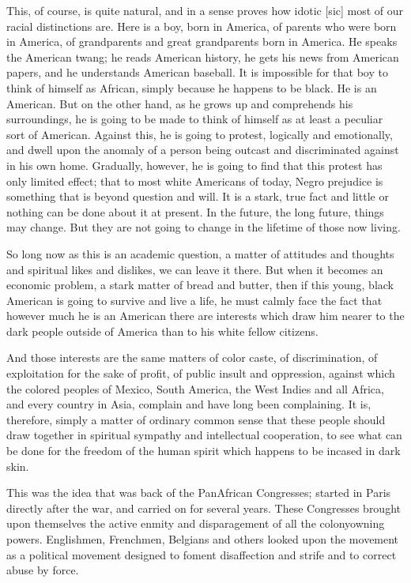 \documentclass[letterpaper,10pt,english]{jupyterBook}
\begin{document}
\sphinxAtStartPar
This, of course, is quite natural, and in a sense proves how idotic {[}sic{]} most of our racial distinctions are. Here is a boy, born in America, of parents who were born in America, of grandparents and great grandparents born in America. He speaks the American twang; he reads American history, he gets his news from American papers, and he understands American baseball. It is impossible for that boy to think of himself as African, simply because he happens to be black. He is an American. But on the other hand, as he grows up and comprehends his surroundings, he is going to be made to think of himself as at least a peculiar sort of American. Against this, he is going to protest, logically and emotionally, and dwell upon the anomaly of a person being outcast and discriminated against in his own home. Gradually, however, he is going to find that this protest has only limited effect; that to most white Americans of today, Negro prejudice is something that is beyond question and will. It is a stark, true fact and little or nothing can be done about it at present. In the future, the long future, things may change. But they are not going to change in the lifetime of those now living.

\sphinxAtStartPar
So long now as this is an academic question, a matter of attitudes and thoughts and spiritual likes and dislikes, we can leave it there. But when it becomes an economic problem, a stark matter of bread and butter, then if this young, black American is going to survive and live a life, he must calmly face the fact that however much he is an American there are interests which draw him nearer to the dark people outside of America than to his white fellow citizens.

\sphinxAtStartPar
And those interests are the same matters of color caste, of discrimination, of exploitation for the sake of profit, of public insult and oppression, against which the colored peoples of Mexico, South America, the West Indies and all Africa, and every country in Asia, complain and have long been complaining. It is, therefore, simply a matter of ordinary common sense that these people should draw together in spiritual sympathy and intellectual co\sphinxhyphen{}operation, to see what can be done for the freedom of the human spirit which happens to be incased in dark skin.

\sphinxAtStartPar
This was the idea that was back of the Pan\sphinxhyphen{}African Congresses; started in Paris directly after the war, and carried on for several years. These Congresses brought upon themselves the active enmity and disparagement of all the colony\sphinxhyphen{}owning powers. Englishmen, Frenchmen, Belgians and others looked upon the movement as a political movement designed to foment disaffection and strife and to correct abuse by force.
\end{document}
